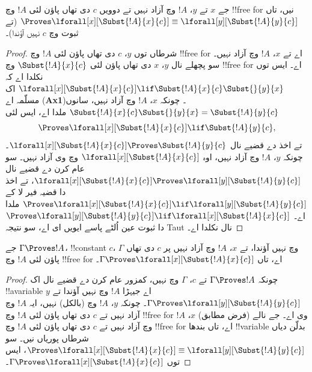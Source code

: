 \documentclass[../../../include/open-logic-section]{subfiles}
\begin{document}
\begin{lem}
جے $x$ تے $y$، $!A$ وچ آزاد نہیں تے دوویں $c$ دی تھاں پاؤن لئی $!A$ وچ !!{free for} نیں، تاں $\Proves \lforall[x][\Subst{!A}{x}{c}] \equiv
\lforall[y][\Subst{!A}{y}{c}]$ (تے ثبوت وچ $c$ نہیں آؤندا)۔
\end{lem}

\begin{proof}
شرطاں توں $y$، $c$ دی تھاں پاؤن لئی $!A$ وچ !!{free for} اے تے $x$، $!A$ وچ آزاد نہیں۔ سو پچھلے  نال $y$، $x$ دی تھاں پاؤن لئی $\Subst{!A}{x}{c}$ وچ !!{free for} اے۔ ایس توں نکلدا اے کہ
$\lforall[x][\Subst{!A}{x}{c}] \lif \Subst{!A}{x}{c} \Subst{}{y}{x}$
اک مسلّمہ اے (\textbf{Ax1})۔ چونکہ $x$، $!A$ وچ آزاد نہیں، سانوں
$\Subst{!A}{x}{c} \Subst{}{y}{x} = \Subst{!A}{y}{c}$ ملدا اے، ایس لئی
\[
\Proves \lforall[x][\Subst{!A}{x}{c}] \lif \Subst{!A}{y}{c},
\]
تے اخذ دے قضیے نال $\lforall[x][\Subst{!A}{x}{c}] \Proves
\Subst{!A}{y}{c}$۔ چونکہ $y$، $!A$ وچ آزاد نہیں، اوہ
$\lforall[x][\Subst{!A}{x}{c}]$ وچ وی آزاد نہیں۔ سو عام کرن دے قضیے نال
$\lforall[x][\Subst{!A}{x}{c}] \Proves \lforall[y][\Subst{!A}{y}{c}]$،
تے اخذ دا قضیہ فیر لا کے $\Proves
\lforall[x][\Subst{!A}{x}{c}] \lif \lforall[y][\Subst{!A}{y}{c}]$ ملدا اے۔
$\Proves \lforall[y][\Subst{!A}{y}{c}] \lif \lforall[x]
[\Subst{!A}{x}{c}]$ دا ثبوت عین اُلٹے پاسے ایویں ای اے، سو نتیجہ Taut نال نکلدا اے۔
\end{proof}

\begin{thm}
جے $\Gamma \Proves !A$، !!{constant} $c$، $\Gamma$ وچ نہیں آؤندا، تے $x$، $!A$ وچ آزاد نہیں پر $c$ دی تھاں پاؤن لئی $!A$ وچ !!{free for} اے، تاں $\Gamma \Proves \lforall[x][\Subst{!A}{x}{c}]$۔
\end{thm}

\begin{proof}
چونکہ $\Gamma \Proves !A$ تے $c$، $\Gamma$ وچ نہیں، کمزور عام کرن دے قضیے نال اک !!a{variable} $y$ اے جیہڑا $!A$ وچ نہیں آؤندا تے
$\Gamma \Proves \lforall[y][\Subst{!A}{y}{c}]$۔ چونکہ $y$، $!A$ وچ (بالکل) نہیں، ایہ $!A$ وچ آزاد نہیں تے $c$ دی تھاں پاؤن لئی $!A$ وچ !!{free for} وی اے۔ جے نالے (فرض مطابق) $x$، $!A$ وچ آزاد نہیں تے $c$ دی تھاں پاؤن لئی $!A$ وچ !!{free for} اے، تاں بندھا !!{variable} بدلّن دیاں شرطاں پوریاں نیں۔ سو
$\Proves \lforall[x][\Subst{!A}{x}{c}] \equiv
\lforall[y][\Subst{!A}{y}{c}]$، ایس توں $\Gamma \Proves
\lforall[x][\Subst{!A}{x}{c}]$۔
\end{proof}
\end{document}
